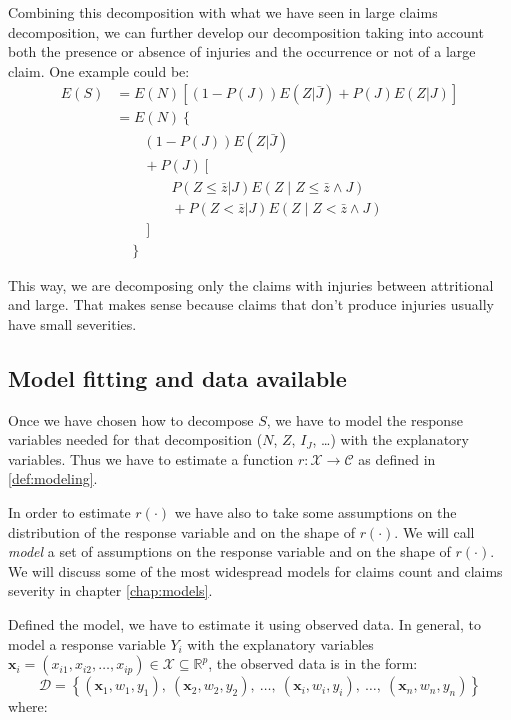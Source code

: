 \documentclass[a4paper, nobind]{templates/ociamthesis}
\theoremstyle{definition}
\theoremstyle{definition}
\theoremstyle{definition}
\theoremstyle{remark}
\begin{document}
Combining this decomposition with what we have seen in large claims decomposition, we can further develop our decomposition taking into account both the presence or absence of injuries and the occurrence or not of a large claim. One example could be:
\begin{align*}
E(S) & = E(N) \left[\left( 1 - P(J) \right) E(Z|\bar{J}) + P(J) E(Z|J) \right] \\[4pt]
  & = E(N) \left\{ \right. \\
  & \qquad \left( 1 - P(J) \right) E(Z|\bar{J}) \\
  & \qquad + P(J) \left[ \right. \\
  & \qquad \qquad P(Z \le \bar{z} | J) E\left( Z \mid Z\le \bar{z} \land J \right) \\
  & \qquad \qquad + P(Z < \bar{z} | J) E\left( Z \mid Z < \bar{z} \land J \right) \\
  & \qquad \left. \right] \\
  & \quad \left. \right\}
\end{align*}

This way, we are decomposing only the claims with injuries between attritional and large. That makes sense because claims that don't produce injuries usually have small severities.

\hypertarget{model-fitting-and-data-available}{%
\subsection{Model fitting and data available}\label{model-fitting-and-data-available}}

Once we have chosen how to decompose \(S\), we have to model the response variables needed for that decomposition (\(N\), \(Z\), \(I_J\), \ldots) with the explanatory variables. Thus we have to estimate a function \(r:\mathcal{X}\rightarrow \mathcal{C}\) as defined in \ref{def:modeling}.

In order to estimate \(r(\cdot)\) we have also to take some assumptions on the distribution of the response variable and on the shape of \(r(\cdot)\). We will call \emph{model} a set of assumptions on the response variable and on the shape of \(r(\cdot)\). We will discuss some of the most widespread models for claims count and claims severity in chapter \ref{chap:models}.

Defined the model, we have to estimate it using observed data. In general, to model a response variable \(Y_i\) with the explanatory variables \(\boldsymbol{x}_i=(x_{i1}, x_{i2}, \dots, x_{ip})\in \mathcal{X} \subseteq \mathbb{R}^p\), the observed data is in the form:
\[
\mathcal{D} = \left\{(\boldsymbol{x}_1, w_1, y_1), \ (\boldsymbol{x}_2, w_2, y_2), \ \dots, \ (\boldsymbol{x}_i, w_i, y_i), \ \dots, \ (\boldsymbol{x}_n, w_n, y_n)\right\}
\]
where:
\end{document}

